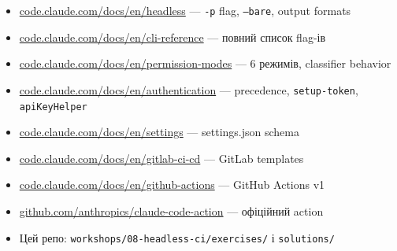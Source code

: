 \documentclass[11pt,a4paper]{article}
\begin{document}
\begin{itemize}
\item \href{https://code.claude.com/docs/en/headless}{code.claude.com/docs/en/headless} --- \texttt{-p} flag, \texttt{--bare}, output formats
\item \href{https://code.claude.com/docs/en/cli-reference}{code.claude.com/docs/en/cli-reference} --- повний список flag-ів
\item \href{https://code.claude.com/docs/en/permission-modes}{code.claude.com/docs/en/permission-modes} --- 6 режимів, classifier behavior
\item \href{https://code.claude.com/docs/en/authentication}{code.claude.com/docs/en/authentication} --- precedence, \texttt{setup-token}, \texttt{apiKeyHelper}
\item \href{https://code.claude.com/docs/en/settings}{code.claude.com/docs/en/settings} --- settings.json schema
\item \href{https://code.claude.com/docs/en/gitlab-ci-cd}{code.claude.com/docs/en/gitlab-ci-cd} --- GitLab templates
\item \href{https://code.claude.com/docs/en/github-actions}{code.claude.com/docs/en/github-actions} --- GitHub Actions v1
\item \href{https://github.com/anthropics/claude-code-action}{github.com/anthropics/claude-code-action} --- офіційний action
\item Цей репо: \texttt{workshops/08-headless-ci/exercises/} і \texttt{solutions/}
\end{itemize}
\end{document}
